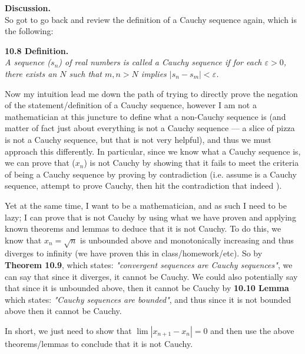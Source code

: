 \documentclass[12pt]{article}
\begin{document}
\textbf{Discussion.} \\
So got to go back and review the definition of a Cauchy sequence again, which is the following:

\textbf{10.8 Definition.}\\
\textit{A sequence ($s_n$) of real numbers is called a \textit{Cauchy sequence} if for each $\varepsilon > 0$, there exists an $N$ such that $m, n >N$ implies $|s_n - s_m| < \varepsilon$.}

Now my intuition lead me down the path of trying to directly prove the negation of the statement/definition of a Cauchy sequence, however I am not a mathematician at this juncture to define what a non-Cauchy sequence is (and matter of fact just about everything is not a Cauchy sequence --- a slice of pizza is not a Cauchy sequence, but that is not very helpful), and thus we must approach this differently. In particular, since we know what a Cauchy sequence is, we can prove that ($x_n$) is not Cauchy by showing that it fails to meet the criteria of being a Cauchy sequence by proving by contradiction (i.e. assume is a Cauchy sequence, attempt to prove Cauchy, then hit the contradiction that indeed ).

Yet at the same time, I want to be a mathematician, and as such I need to be lazy; I can prove that is not Cauchy by using what we have proven and applying known theorems and lemmas to deduce that it is not Cauchy. To do this, we know that $x_n = \sqrt{n}$ is unbounded above and monotonically increasing and thus diverges to infinity (we have proven this in class/homework/etc). So by \textbf{Theorem 10.9}, which states: \textit{"convergent sequences are Cauchy sequences"}, we can say that since it diverges, it cannot be Cauchy. We could also potentially say that since it is unbounded above, then it cannot be Cauchy by \textbf{10.10 Lemma} which states: \textit{"Cauchy sequences are bounded"}, and thus since it is not bounded above then it cannot be Cauchy. 

In short, we just need to show that $\lim |x_{n+1} - x_n| = 0$ and then use the above theorems/lemmas to conclude that it is not Cauchy.
\vspace{0.25em}



\end{document}
